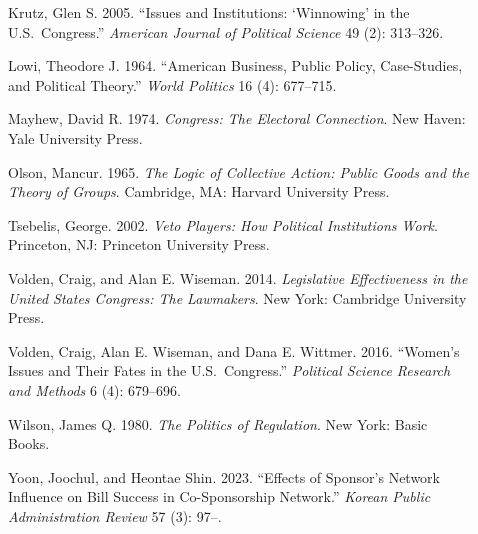 \documentclass[11pt]{article}
\begin{document}
\begin{description}
\item[] Krutz, Glen S. 2005. ``Issues and Institutions: `Winnowing' in the U.S.\ Congress.'' \textit{American Journal of Political Science} 49 (2): 313--326.

\item[] Lowi, Theodore J. 1964. ``American Business, Public Policy, Case-Studies, and Political Theory.'' \textit{World Politics} 16 (4): 677--715.

\item[] Mayhew, David R. 1974. \textit{Congress: The Electoral Connection}. New Haven: Yale University Press.

\item[] Olson, Mancur. 1965. \textit{The Logic of Collective Action: Public Goods and the Theory of Groups}. Cambridge, MA: Harvard University Press.

\item[] Tsebelis, George. 2002. \textit{Veto Players: How Political Institutions Work}. Princeton, NJ: Princeton University Press.

\item[] Volden, Craig, and Alan E. Wiseman. 2014. \textit{Legislative Effectiveness in the United States Congress: The Lawmakers}. New York: Cambridge University Press.

\item[] Volden, Craig, Alan E. Wiseman, and Dana E. Wittmer. 2016. ``Women's Issues and Their Fates in the U.S.\ Congress.'' \textit{Political Science Research and Methods} 6 (4): 679--696.

\item[] Wilson, James Q. 1980. \textit{The Politics of Regulation}. New York: Basic Books.

\item[] Yoon, Joochul, and Heontae Shin. 2023. ``Effects of Sponsor's Network Influence on Bill Success in Co-Sponsorship Network.'' \textit{Korean Public Administration Review} 57 (3): 97--.

\end{description}
\end{document}
